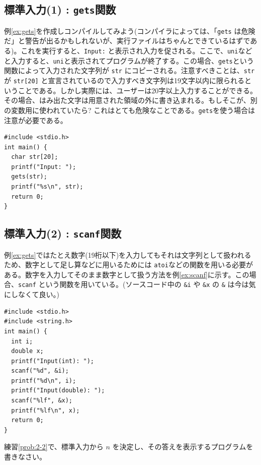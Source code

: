 \subsection{標準入力(1) : {\tt gets}関数}
例\ref{ex:gets}を作成しコンパイルしてみよう(コンパイラによっては、「\verb|gets| は危険だ」と警告が出るかもしれないが、実行ファイルはちゃんとできているはずである)。これを実行すると、\verb|Input:| と表示され入力を促される。ここで、\verb|uni|などと入力すると、\verb|uni|と表示されてプログラムが終了する。この場合、\verb|gets|という関数によって入力された文字列が \verb|str| にコピーされる。注意すべきことは、\verb|str| が \verb|str[20]| と宣言されているので入力すべき文字列は19文字以内に限られるということである。しかし実際には、ユーザーは20字以上入力することができる。その場合、はみ出た文字は用意された領域の外に書き込まれる。もしそこが、別の変数用に使われていたら? これはとても危険なことである。\verb|gets|を使う場合は注意が必要である。
%
\begin{reidai}\label{ex:gets}
\begin{verbatim}
#include <stdio.h>
int main() {
  char str[20];
  printf("Input: ");
  gets(str);
  printf("%s\n", str);
  return 0;
}
\end{verbatim}
\end{reidai}
%

\subsection{標準入力(2) : {\tt scanf}関数}
例\ref{ex:gets}ではたとえ数字(19桁以下)を入力してもそれは文字列として扱われるため、数字として足し算などに用いるためには \verb|atoi|などの関数を用いる必要がある。数字を入力してそのまま数字として扱う方法を例\ref{ex:scanf}に示す。この場合、\verb|scanf| という関数を用いている。(ソースコード中の \verb|&i| や \verb|&x| の \verb|&| は今は気にしなくて良い。)
%
\begin{reidai}\label{ex:scanf}
\begin{verbatim}
#include <stdio.h>
#include <string.h>
int main() {
  int i;
  double x;
  printf("Input(int): ");
  scanf("%d", &i);
  printf("%d\n", i);
  printf("Input(double): ");
  scanf("%lf", &x);
  printf("%lf\n", x);
  return 0;
}
\end{verbatim}
\end{reidai}
%

\begin{renshuu}\label{prob:4-1}
練習\ref{prob:2-2}で、標準入力から $n$ を決定し、その答えを表示するプログラムを書きなさい。
\end{renshuu}

